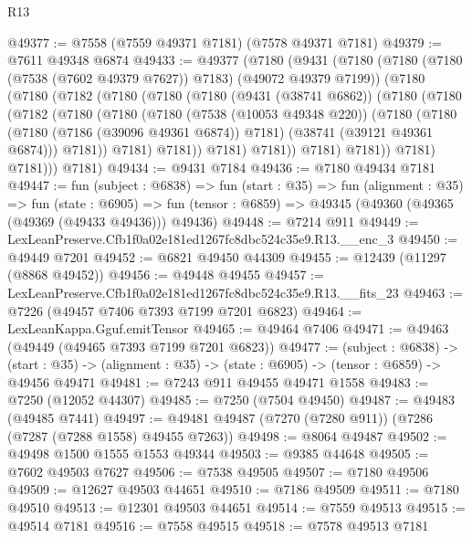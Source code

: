 \begin{lexlean}{R13}
\begin{coremodule}
@49377 := @7558 (@7559 @49371 @7181) (@7578 @49371 @7181)
@49379 := @7611 @49348 @6874
@49433 := @49377
    (@7180
      (@9431
        (@7180
          (@7180 (@7180 (@7538 (@7602 @49379 @7627)) @7183) (@49072 @49379 @7199))
          (@7180
            (@7180
              (@7182
                (@7180
                  (@7180
                    (@7180
                      (@9431 (@38741 @6862))
                      (@7180
                        (@7180
                          (@7182
                            (@7180
                              (@7180
                                (@7180
                                  (@7538 (@10053 @49348 @220))
                                  (@7180
                                    (@7180
                                      (@7180 (@7186 (@39096 @49361 @6874)) @7181)
                                      (@38741 (@39121 @49361 @6874)))
                                    @7181))
                                @7181)
                              @7181))
                          @7181)
                        @7181))
                    @7181)
                  @7181))
              @7181)
            @7181)))
      @7181)
@49434 := @9431 @7184
@49436 := @7180 @49434 @7181
@49447 := fun (subject : @6838) =>
  fun (start : @35) =>
  fun (alignment : @35) =>
  fun (state : @6905) =>
  fun (tensor : @6859) => @49345 (@49360 (@49365 (@49369 (@49433 @49436))) @49436)
@49448 := @7214 @911
@49449 := LexLeanPreserve.Cfb1f0a02e181ed1267fc8dbc524c35e9.R13.__enc_3
@49450 := @49449 @7201
@49452 := @6821 @49450 @44309
@49455 := @12439 (@11297 (@8868 @49452))
@49456 := @49448 @49455
@49457 := LexLeanPreserve.Cfb1f0a02e181ed1267fc8dbc524c35e9.R13.__fits_23
@49463 := @7226 (@49457 @7406 @7393 @7199 @7201 @6823)
@49464 := LexLeanKappa.Gguf.emitTensor
@49465 := @49464 @7406
@49471 := @49463 (@49449 (@49465 @7393 @7199 @7201 @6823))
@49477 := (subject : @6838) ->
  (start : @35) -> (alignment : @35) -> (state : @6905) -> (tensor : @6859) -> @49456 @49471
@49481 := @7243 @911 @49455 @49471 @1558
@49483 := @7250 (@12052 @44307)
@49485 := @7250 (@7504 @49450)
@49487 := @49483 (@49485 @7441)
@49497 := @49481 @49487 (@7270 (@7280 @911)) (@7286 (@7287 (@7288 @1558) @49455 @7263))
@49498 := @8064 @49487
@49502 := @49498 @1500 @1555 @1553 @49344
@49503 := @9385 @44648
@49505 := @7602 @49503 @7627
@49506 := @7538 @49505
@49507 := @7180 @49506
@49509 := @12627 @49503 @44651
@49510 := @7186 @49509
@49511 := @7180 @49510
@49513 := @12301 @49503 @44651
@49514 := @7559 @49513
@49515 := @49514 @7181
@49516 := @7558 @49515
@49518 := @7578 @49513 @7181

\end{coremodule}
\end{lexlean}
